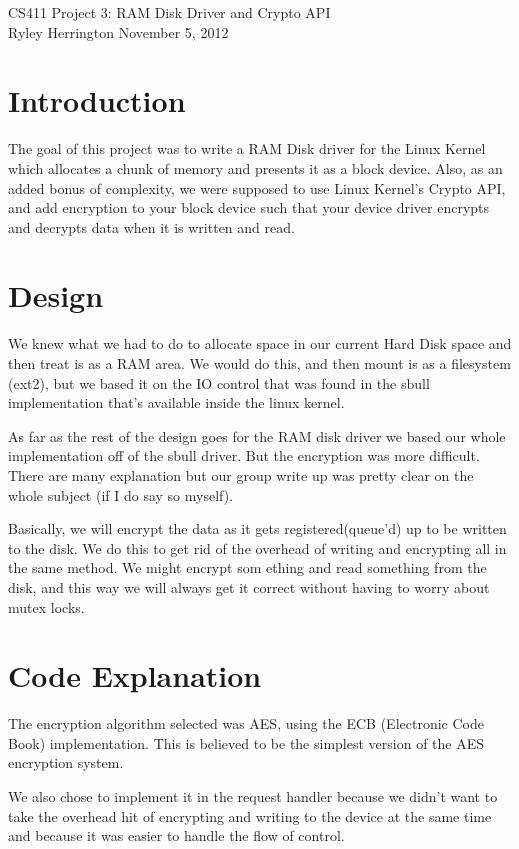 \documentclass[letterpaper,10pt]{article}
\begin{document}
\begin{center}
{\large CS411 Project 3: RAM Disk Driver and Crypto API} \\ %
Ryley Herrington
November 5, 2012
\end{center}

\section{Introduction}
The goal of this project was to write a RAM Disk driver for the Linux Kernel which allocates a chunk of memory and presents it as a block device. Also, as an added bonus of complexity, we were supposed to use Linux Kernel's Crypto API, and add encryption to your block device such that your device driver encrypts and decrypts data when it is written and read.

\section{Design}
We knew what we had to do to allocate space in our current Hard Disk space and then treat is as a RAM area. We would do this, and then mount is as a filesystem (ext2), but we based it on the IO control that was found in the sbull implementation that's available inside the linux kernel. 

As far as the rest of the design goes for the RAM disk driver we based our whole implementation off of the sbull driver. But the encryption was more difficult. There are many explanation but our group write up was pretty clear on the whole subject (if I do say so myself). 

Basically, we will encrypt the data as it gets registered(queue'd) up to be written to the disk. We do this to get rid of the overhead of writing and encrypting all in the same method. We might encrypt som ething and read something from the disk, and this way we will always get it correct without having to worry about mutex locks.  

\section{Code Explanation}
The encryption algorithm selected was AES, using the ECB (Electronic Code Book) implementation. This is believed to be the simplest version of the AES encryption system.

We also chose to implement it in the request handler because we didn’t want to take the overhead hit of encrypting and writing to the device at the same time and because it was easier to handle the flow of control. 
\end{document}
